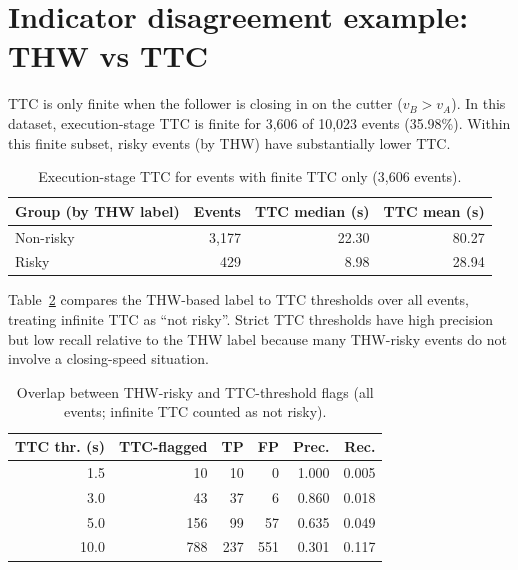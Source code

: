 \documentclass[12pt,a4paper,twoside,openright]{report}
\begin{document}
    \section{Indicator disagreement example: THW vs TTC}
    TTC is only finite when the follower is closing in on the cutter ($v_B>v_A$). In this dataset, execution-stage TTC is finite for 3,606 of 10,023 events (35.98\%). Within this finite subset, risky events (by THW) have substantially lower TTC.

    \begin{table}[H]
        \centering
        \caption{Execution-stage TTC for events with finite TTC only (3,606 events).}
        \label{tab:ttc-finite}
        \begin{tabular}{@{}lrrr@{}}
            \toprule
            Group (by THW label) & Events & TTC median (s) & TTC mean (s) \\
            \midrule
            Non-risky & 3,177 & 22.30 & 80.27 \\
            Risky & 429 & 8.98 & 28.94 \\
            \bottomrule
        \end{tabular}
    \end{table}

    Table~\ref{tab:ttc-thw-overlap} compares the THW-based label to TTC thresholds over all events, treating infinite TTC as ``not risky''. Strict TTC thresholds have high precision but low recall relative to the THW label because many THW-risky events do not involve a closing-speed situation.

    \begin{table}[H]
        \centering
        \caption{Overlap between THW-risky and TTC-threshold flags (all events; infinite TTC counted as not risky).}
        \label{tab:ttc-thw-overlap}
        \begin{tabular}{@{}rrrrrr@{}}
            \toprule
            TTC thr. (s) & TTC-flagged & TP & FP & Prec. & Rec. \\
            \midrule
            1.5 & 10 & 10 & 0 & 1.000 & 0.005 \\
            3.0 & 43 & 37 & 6 & 0.860 & 0.018 \\
            5.0 & 156 & 99 & 57 & 0.635 & 0.049 \\
            10.0 & 788 & 237 & 551 & 0.301 & 0.117 \\
            \bottomrule
        \end{tabular}
    \end{table}
\end{document}
